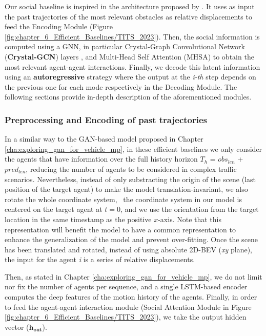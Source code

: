 Our social baseline is inspired in the architecture proposed by \cite{schmidt2022crat}. It uses as input the past trajectories of the most relevant obstacles as relative displacements to feed the Encoding Module (Figure \ref{fig:chapter_6_Efficient_Baselines/TITS_2023}). Then, the social information is computed using a \ac{GNN}, in particular Crystal-Graph Convolutional Network (\textbf{Crystal-GCN}) layers \cite{xie2018crystal, schmidt2022crat}, and Multi-Head Self Attention (MHSA) \cite{vaswani2017attention} to obtain the most relevant agent-agent interactions. Finally, we decode this latent information using an \textbf{autoregressive} strategy where the output at the \textit{i-th} step depends on the previous one for each mode respectively in the Decoding Module. The following sections provide in-depth description of the aforementioned modules.

\subsubsection{Preprocessing and Encoding of past trajectories}
\label{subsubsec:6_efficient_baselines_social_preprocessing_and_encoding}

In a similar way to the GAN-based model proposed in Chapter \ref{cha:exploring_gan_for_vehicle_mp}, in these efficient baselines we only consider the agents that have information over the full history horizon $T_h$ = \textit{$obs_{len}$} + \textit{$pred_{len}$}, reducing the number of agents to be considered in complex traffic scenarios. Nevertheless, instead of only substracting the origin of the scene (last position of the target agent) to make the model translation-invariant, we also rotate the whole coordinate system, \ie \ the coordinate system in our model is centered on the target agent at $t = 0$, and we use the orientation from the target location in the same timestamp as the positive $x$-axis. Note that this representation will benefit the model to have a common representation to enhance the generalization of the model and prevent over-fitting. Once the scene has been translated and rotated, instead of using absolute 2D-BEV (\textit{xy} plane), the input for the agent \textit{i} is a series of relative displacements.

Then, as stated in Chapter \ref{cha:exploring_gan_for_vehicle_mp}, we do not limit nor fix the number of agents per sequence, and a single \ac{LSTM}-based encoder computes the deep features of the motion history of the agents. Finally, in order to feed the agent-agent interaction module (Social Attention Module in Figure \ref{fig:chapter_6_Efficient_Baselines/TITS_2023}), we take the output hidden vector ($\mathbf{h_{out}}$).

